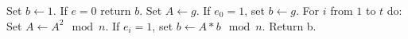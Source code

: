 \documentclass{subfiles}
\begin{document}
    \begin{algorithm}[!ht]
        \caption{Square and Multiply algorithm}\label{Fig:1}
        Set \(b \leftarrow 1\). If \(e = 0\) return \(b\).
        \DontPrintSemicolon\;
        Set \(A \leftarrow g\).
        \DontPrintSemicolon\;
        If \(e_{0} = 1\), set \(b \leftarrow g\).
        \DontPrintSemicolon\;
        For \(i\) from \(1\) to \(t\) do:
        \DontPrintSemicolon\;
            \Indp Set \(A \leftarrow A^{2} \mod{n}\).
            \DontPrintSemicolon\;
            If \(e_{i} = 1\), set \(b \leftarrow A * b \mod{n}\).
        \DontPrintSemicolon\;
        \Indm Return b.
    \end{algorithm}
\end{document}
